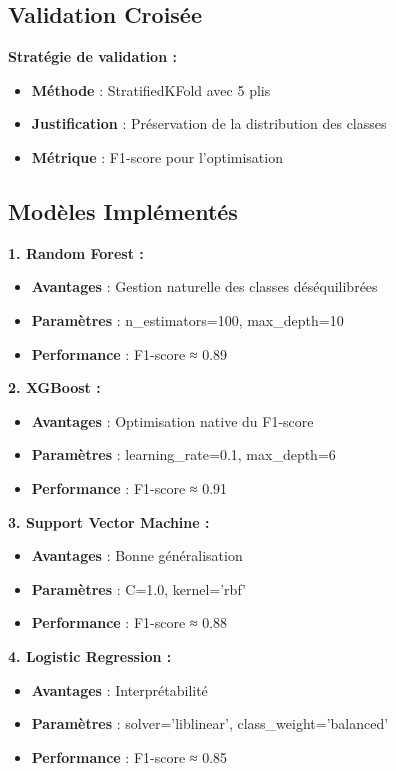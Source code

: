 \documentclass[12pt,a4paper]{article}
\begin{document}
\subsection{Validation Croisée}

\textbf{Stratégie de validation :}
\begin{itemize}
    \item \textbf{Méthode} : StratifiedKFold avec 5 plis
    \item \textbf{Justification} : Préservation de la distribution des classes
    \item \textbf{Métrique} : F1-score pour l'optimisation
\end{itemize}

\subsection{Modèles Implémentés}

\textbf{1. Random Forest :}
\begin{itemize}
    \item \textbf{Avantages} : Gestion naturelle des classes déséquilibrées
    \item \textbf{Paramètres} : n\_estimators=100, max\_depth=10
    \item \textbf{Performance} : F1-score ≈ 0.89
\end{itemize}

\textbf{2. XGBoost :}
\begin{itemize}
    \item \textbf{Avantages} : Optimisation native du F1-score
    \item \textbf{Paramètres} : learning\_rate=0.1, max\_depth=6
    \item \textbf{Performance} : F1-score ≈ 0.91
\end{itemize}

\textbf{3. Support Vector Machine :}
\begin{itemize}
    \item \textbf{Avantages} : Bonne généralisation
    \item \textbf{Paramètres} : C=1.0, kernel='rbf'
    \item \textbf{Performance} : F1-score ≈ 0.88
\end{itemize}

\textbf{4. Logistic Regression :}
\begin{itemize}
    \item \textbf{Avantages} : Interprétabilité
    \item \textbf{Paramètres} : solver='liblinear', class\_weight='balanced'
    \item \textbf{Performance} : F1-score ≈ 0.85
\end{itemize}
\end{document}
